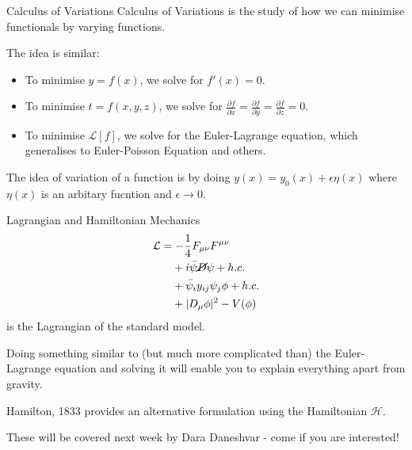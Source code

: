 \documentclass{beamer}
\begin{document}
\begin{frame}{Calculus of Variations} \pause
    Calculus of Variations is the study of how we can minimise functionals by varying functions. \pause

    The idea is similar: \pause
    \begin{itemize}
        \item To minimise \(y = f(x)\), \pause we solve for \(f'(x) = 0\). \pause
        \item To minimise \(t = f(x, y, z)\), \pause we solve for \(\frac{\partial f}{\partial x} = \frac{\partial f}{\partial y}  = \frac{\partial f}{\partial z} = 0\). \pause
        \item To minimise \(\mathcal{L}[f]\), \pause we solve for the Euler-Lagrange equation, which generalises to Euler-Poisson Equation and others. \pause
    \end{itemize}

    The idea of variation of a function is by doing \(y (x) = y_0 (x) + \epsilon \eta (x)\) where \(\eta(x)\) is an arbitary fucntion and \(\epsilon \rightarrow 0\).
\end{frame}

\begin{frame}{Lagrangian and Hamiltonian Mechanics}
    \begin{align*}
        \mathcal{L} & = - \frac{1}{4} F_{\mu \nu} F^{\mu \nu}               \\
                    & \phantom{{}=}+ i \bar{\psi} \cancel{D} \psi + h.c.    \\
                    & \phantom{{}=}+ \bar{\psi}_i y_{ij} \psi_j \phi + h.c. \\
                    & \phantom{{}=}+ |D_\mu \phi|^2 - V(\phi)
    \end{align*} \pause
    is the Lagrangian of the standard model. \pause

    Doing something similar to (but much more complicated than) the Euler-Lagrange equation and solving it will enable you to explain everything apart from gravity. \pause

    Hamilton, 1833 provides an alternative formulation using the Hamiltonian \(\mathcal{H}\). \pause

    These will be covered next week by Dara Daneshvar - come if you are interested!
\end{frame}
\end{document}
